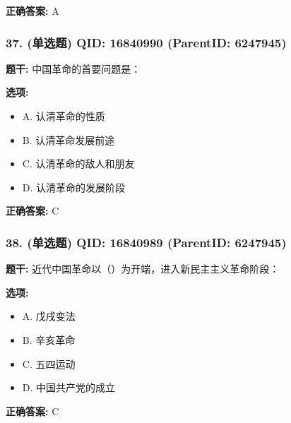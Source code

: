 \documentclass[12pt,UTF8]{ctexart}
\begin{document}
\textbf{正确答案:}
A

\vspace{0.3em}\hrulefill\vspace{0.7em}

\subsubsection*{37. (单选题) \small QID: 16840990 (ParentID: 6247945)}

\textbf{题干:}
中国革命的首要问题是：



\textbf{选项:}
\begin{itemize}[leftmargin=*]

  \item A. 认清革命的性质

  \item B. 认清革命发展前途

  \item C. 认清革命的敌人和朋友

  \item D. 认清革命的发展阶段

\end{itemize}

\textbf{正确答案:}
C

\vspace{0.3em}\hrulefill\vspace{0.7em}

\subsubsection*{38. (单选题) \small QID: 16840989 (ParentID: 6247945)}

\textbf{题干:}
近代中国革命以（）为开端，进入新民主主义革命阶段：



\textbf{选项:}
\begin{itemize}[leftmargin=*]

  \item A. 戊戌变法

  \item B. 辛亥革命

  \item C. 五四运动

  \item D. 中国共产党的成立

\end{itemize}

\textbf{正确答案:}
C
\end{document}
